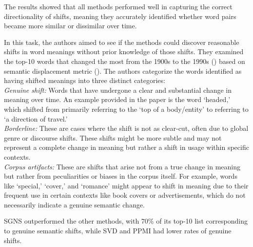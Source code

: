 The results showed that all methods performed well in capturing the correct directionality of shifts, meaning they accurately identified whether word pairs became more similar or dissimilar over time.

In this task, the authors aimed to see if the methods could discover reasonable shifts in word meanings without prior knowledge of those shifts.
They examined the top-10 words that changed the most from the 1900s to the 1990s () based on semantic displacement metric ().
The authors categorize the words identified as having shifted meanings into three distinct categories:\\
\emph{Genuine shift:} Words that have undergone a clear and substantial change in meaning over time.
An example provided in the paper is the word `headed,' which shifted from primarily referring to the `top of a body/entity' to referring to `a direction of travel.'\\
\emph{Borderline:} These are cases where the shift is not as clear-cut, often due to global genre or discourse shifts.
These shifts might be more subtle and may not represent a complete change in meaning but rather a shift in usage within specific contexts.\\
\emph{Corpus artifacts:} These are shifts that arise not from a true change in meaning but rather from peculiarities or biases in the corpus itself.
For example, words like `special,' `cover,' and `romance' might appear to shift in meaning due to their frequent use in certain contexts like book covers or advertisements, which do not necessarily indicate a genuine semantic change.

SGNS outperformed the other methods, with 70\% of its top-10 list corresponding to genuine semantic shifts, while SVD and PPMI had lower rates of genuine shifts.

